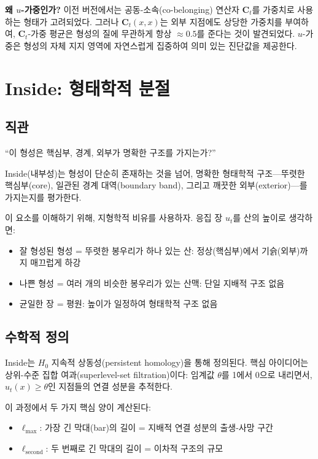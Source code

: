 \textbf{왜 $u$-가중인가?} 이전 버전에서는 공동-소속(co-belonging) 연산자 $\mathbf{C}_t$를 가중치로 사용하는 형태가 고려되었다. 그러나 $\mathbf{C}_t(x,x)$는 외부 지점에도 상당한 가중치를 부여하여, $\mathbf{C}_t$-가중 평균은 형성의 질에 무관하게 항상 $\approx 0.5$를 준다는 것이 발견되었다. $u$-가중은 형성의 자체 지지 영역에 자연스럽게 집중하여 의미 있는 진단값을 제공한다.


\section{Inside: 형태학적 분절}
\label{sec:inside}

\subsection{직관}

``이 형성은 핵심부, 경계, 외부가 명확한 구조를 가지는가?''

Inside(내부성)는 형성이 단순히 존재하는 것을 넘어, 명확한 형태학적 구조---뚜렷한 핵심부(core), 일관된 경계 대역(boundary band), 그리고 깨끗한 외부(exterior)---를 가지는지를 평가한다.

이 요소를 이해하기 위해, 지형학적 비유를 사용하자. 응집 장 $u_t$를 산의 높이로 생각하면:
\begin{itemize}
    \item 잘 형성된 형성 = 뚜렷한 봉우리가 하나 있는 산: 정상(핵심부)에서 기슭(외부)까지 매끄럽게 하강
    \item 나쁜 형성 = 여러 개의 비슷한 봉우리가 있는 산맥: 단일 지배적 구조 없음
    \item 균일한 장 = 평원: 높이가 일정하여 형태학적 구조 없음
\end{itemize}


\subsection{수학적 정의}

Inside는 $H_0$ 지속적 상동성(persistent homology)을 통해 정의된다. 핵심 아이디어는 상위-수준 집합 여과(superlevel-set filtration)이다: 임계값 $\theta$를 1에서 0으로 내리면서, $u_t(x) \geq \theta$인 지점들의 연결 성분을 추적한다.

이 과정에서 두 가지 핵심 양이 계산된다:
\begin{itemize}
    \item $\ell_{\max}$: 가장 긴 막대(bar)의 길이 = 지배적 연결 성분의 출생-사망 구간
    \item $\ell_{\mathrm{second}}$: 두 번째로 긴 막대의 길이 = 이차적 구조의 규모
\end{itemize}

